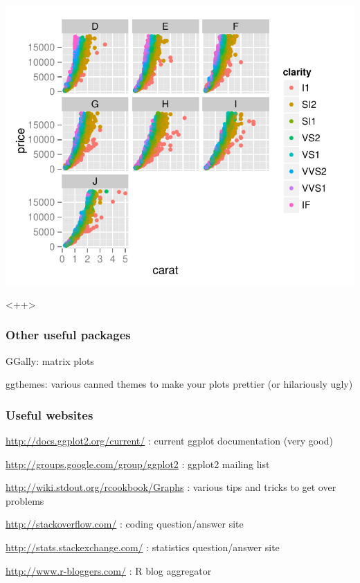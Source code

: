 \documentclass{beamer}\usepackage{graphicx, color}
\makeatletter
\def\maxwidth{ %
  \ifdim\Gin@nat@width>\linewidth
    \linewidth
  \else
    \Gin@nat@width
  \fi
}
\newenvironment{knitrout}{}{} %
\makeatother
\begin{document}
\begin{frame}
\begin{knitrout}
\color{fgcolor}
\includegraphics[width=\maxwidth]{figure/dia2-plot} 

\end{knitrout}

\end{frame}<++>


\begin{frame}
  \frametitle{Other useful packages}

  GGally: matrix plots

  ggthemes: various canned themes to make your plots prettier (or hilariously ugly)

\end{frame}

\begin{frame}
  \frametitle{Useful websites}

  \url{http://docs.ggplot2.org/current/} : current ggplot documentation (very good)

  \url{http://groups.google.com/group/ggplot2} : ggplot2 mailing list

  \url{http://wiki.stdout.org/rcookbook/Graphs} : various tips and tricks to get over problems

  \url{http://stackoverflow.com/} : coding question/answer site

  \url{http://stats.stackexchange.com/} : statistics question/answer site

  \url{http://www.r-bloggers.com/} : R blog aggregator

\end{frame}
\end{document}
